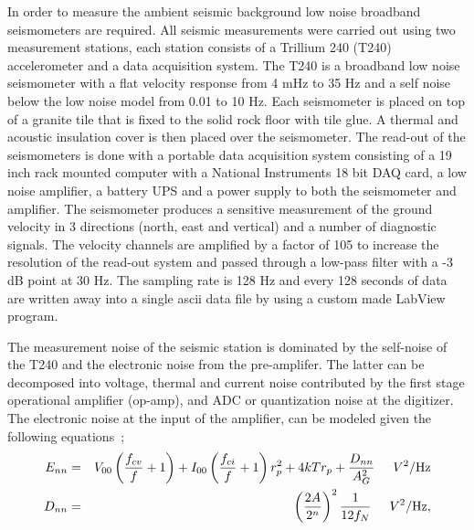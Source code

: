 
In order to measure the ambient seismic background low noise broadband seismometers are required. All seismic measurements were carried out using two measurement stations, each station consists of a Trillium 240 (T240) accelerometer and a data acquisition system. The T240 is a broadband low noise seismometer with a flat velocity response from 4 mHz to 35 Hz and a self noise below the low noise model from 0.01 to 10 Hz. Each seismometer is placed on top of a granite tile that is fixed to the solid rock floor with tile glue. A thermal and acoustic insulation cover is then placed over the seismometer. The read-out of the seismometers is done with a portable data acquisition system consisting of a 19 inch rack mounted computer with a National Instruments 18 bit DAQ card, a low noise amplifier, a battery UPS and a power supply to both the seismometer and amplifier. The seismometer produces a sensitive measurement of the ground velocity in 3 directions (north, east and vertical) and a number of diagnostic signals. The velocity channels are amplified by a factor of 105 to increase the resolution of the read-out system and passed through a low-pass filter with a -3 dB point at 30 Hz. The sampling rate is 128 Hz and every 128 seconds of data are written away into a single ascii data file by using a custom made LabView program.

The measurement noise of the seismic station is dominated by the self-noise of the T240 and the electronic noise from the pre-amplifer. The latter can be decomposed into voltage, thermal and current noise contributed by the first stage operational amplifier (op-amp), and ADC or quantization noise at the digitizer. The electronic noise at the input of the amplifier, can be modeled given the following equations~\cite{Rodgers1994};
\begin{eqnarray}
\label{eq:elecnoise1}
E_{nn} &=& V_{00}\left(\frac{f_{cv}}{f}+1\right)+ I_{00}\left(\frac{f_{ci}}{f}+1\right)r_p^2+4kTr_p+\frac{D_{nn}}{A_G^2}  \hspace{0.5 cm} V^2/\mbox{Hz} \\
D_{nn} &=& \left(\frac{2A}{2^n}\right)^2\frac{1}{12f_N} \hspace{0.5 cm} V^2/\mbox{Hz},
\label{eq:elecnoise3}
\end{eqnarray}

